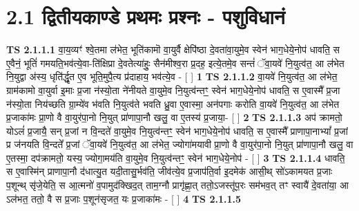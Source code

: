 \documentclass[17pt]{extarticle}
\begin{document}
     \section*{ 2.1      द्वितीयकाण्डे  प्रथमः प्रश्नः - पशुविधानं }
                                        \textbf{ TS 2.1.1.1} \newline
                  वा॒य॒व्यꣳ॑ श्वे॒तमा ल॑भेत॒ भूति॑कामॊ  वा॒युर्वै क्षेपि॑ष्ठा दे॒वता॑वा॒युमे॒व स्वेन॑ भाग॒धेये॒नोप॑ धावति॒ स ए॒वैनं॒ भूतिं॑ गमयति॒भव॑त्ये॒वा-ति॑क्षिप्रा दे॒वतेत्या॑हुः॒ सैन॑मीश्व॒रा प्र॒दह॒ इत्ये॒तमे॒व सन्तं॑ ॅवा॒यवे॑ नि॒युत्व॑त॒ आ ल॑भेत नि॒युद्वा अ॑स्य॒ धृति॑र्द्धृ॒त ए॒व भूति॒मुपै॒त्य प्र॑दाहाय॒ भव॑त्ये॒व - [  ] \textbf{  1} \newline
                  \newline
                                \textbf{ TS 2.1.1.2} \newline
                  वा॒यवे॑ नि॒युत्व॑त॒ आ ल॑भेत॒ ग्राम॑कामो वा॒युर्वा इ॒माः प्र॒जा न॑स्यो॒ता ने॑नीयते वा॒युमे॒व नि॒युत्व॑न्तꣳ॒॒ स्वेन॑ भाग॒धेये॒नोप॑ धावति॒ स ए॒वास्मै᳚ प्र॒जा न॑स्यो॒ता निय॑च्छति ग्रा॒म्ये॑व भ॑वति नि॒युत्व॑ते भवति ध्रु॒वा ए॒वास्मा॒ अन॑पगाः करोति वा॒यवे॑ नि॒युत्व॑त॒ आ ल॑भेत प्र॒जाका॑मः प्रा॒णो वै वा॒युर॑पा॒नो नि॒युत् प्रा॑णापा॒नौ खलु॒ वा ए॒तस्य॑ प्र॒जाया॒-  [  ] \textbf{  2} \newline
                  \newline
                                \textbf{ TS 2.1.1.3} \newline
                  अप॑ क्रामतो॒ योऽलं॑ प्र॒जायै॒ सन् प्र॒जां न वि॒न्दते॑ वा॒युमे॒व नि॒युत्व॑न्तꣳ॒॒  स्वेन॑ भाग॒धेये॒नोप॑ धावति॒ स ए॒वास्मै᳚ प्राणापा॒नाभ्यां᳚ प्र॒जां प्र ज॑नयति वि॒न्दते᳚ प्र॒जां ॅवा॒यवे॑ नि॒युत्व॑त॒ आ ल॑भेत॒ ज्योगा॑मयावी प्रा॒णो वै वा॒युर॑पा॒नो नि॒युत् प्रा॑णापा॒नौ खलु॒ वा ए॒तस्मा॒ दप॑क्रामतो॒ यस्य॒ ज्योगा॒मय॑ति वा॒युमे॒व नि॒युत्व॑न्तꣳ॒॒ स्वेन॑ भाग॒धेये॒नोप॑ - [  ] \textbf{  3} \newline
                  \newline
                                \textbf{ TS 2.1.1.4} \newline
                  धावति॒ स ए॒वास्मि॑न् प्राणापा॒नौ द॑धात्यु॒त यदी॒तासु॒र्भव॑ति॒ जीव॑त्ये॒व प्र॒जाप॑ति॒र्वा इ॒दमेक॑ आसी॒थ् सो॑ऽकामयत प्र॒जाः प॒शून्थ् सृ॑जे॒येति॒ स आ॒त्मनो॑ व॒पामुद॑क्खिद॒त् ताम॒ग्नौ प्रागृ॑ह्णा॒त् ततो॒ऽजस्तू॑प॒रः सम॑भव॒त् तꣳ स्वायै॑ दे॒वता॑या॒ आ ऽल॑भत॒ ततो॒ वै स प्र॒जाः प॒शून॑सृजत॒ यः प्र॒जाका॑मः - [  ] \textbf{  4} \newline
                  \newline
                                \textbf{ TS 2.1.1.5} \newline
\end{document}
